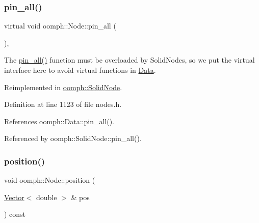 \mbox{\label{classoomph_1_1Node_a3f0d0e77ba866ce8ad3c5c012b647080}} 
\subsubsection{\texorpdfstring{pin\+\_\+all()}{pin\_all()}}
{\footnotesize\ttfamily virtual void oomph\+::\+Node\+::pin\+\_\+all (\begin{DoxyParamCaption}{ }\end{DoxyParamCaption})\hspace{0.3cm}{\ttfamily [inline]}, {\ttfamily [virtual]}}



The \hyperlink{classoomph_1_1Node_a3f0d0e77ba866ce8ad3c5c012b647080}{pin\+\_\+all()} function must be overloaded by Solid\+Nodes, so we put the virtual interface here to avoid virtual functions in \hyperlink{classoomph_1_1Data}{Data}. 



Reimplemented in \hyperlink{classoomph_1_1SolidNode_ab051ba65aed07fe75f6cfd9b32de62cc}{oomph\+::\+Solid\+Node}.



Definition at line 1123 of file nodes.\+h.



References oomph\+::\+Data\+::pin\+\_\+all().



Referenced by oomph\+::\+Solid\+Node\+::pin\+\_\+all().

\mbox{\label{classoomph_1_1Node_a61c3ad6b319e4d2cce38dc8faae1bfae}} 
\subsubsection{\texorpdfstring{position()}{position()}\hspace{0.1cm}{\footnotesize\ttfamily [1/5]}}
{\footnotesize\ttfamily void oomph\+::\+Node\+::position (\begin{DoxyParamCaption}\item[{\hyperlink{classoomph_1_1Vector}{Vector}$<$ double $>$ \&}]{pos }\end{DoxyParamCaption}) const}




